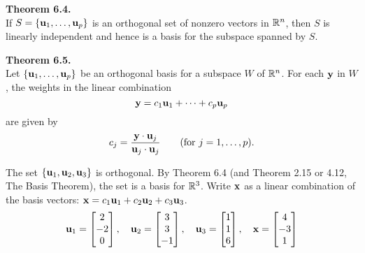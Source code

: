 \begin{boxthm}
	\textbf{Theorem 6.4.} \\
	If $S=\vectset[u]{1}{p}$ is an orthogonal set of nonzero vectors in $\R^n$, then $S$ is linearly independent and hence is a basis for the subspace spanned by $S$.
\end{boxthm}
\vspace{-1em}
\begin{boxthm}
	\textbf{Theorem 6.5.} \\
	Let $\vectset[u]{1}{p}$ be an orthogonal basis for a subspace $W$ of $\R^n$. For each $\vect{y}$ in $W$, the weights in the linear combination
	\vspace{-1ex}
	$$ \vect{y} = c_1\vect{u}_1+\cdots+c_p\vect{u}_p $$
	are given by 
	\vspace{-1ex}
	$$ c_j = \frac{\vect{y}\cdot\vect{u}_j}{\vect{u}_j\cdot\vect{u}_j} \qquad
	(\text{for } j=1,\ldots,p). $$
\end{boxthm}


\begin{exercise} %
	The set $\{\vect{u}_1,\vect{u}_2,\vect{u}_3\}$ is orthogonal. By Theorem 6.4 (and Theorem 2.15 or 4.12, The Basis Theorem), the set is a basis for $\R^3$. Write $\vect{x}$ as a linear combination of the basis vectors: $\vect{x} = c_1\vect{u}_1 + c_2\vect{u}_2 + c_3\vect{u}_3$.
	$$ \vect{u}_1 = \begin{bmatrix}2\\-2\\0\end{bmatrix}, \quad
	\vect{u}_2 = \begin{bmatrix}3\\3\\-1\end{bmatrix}, \quad
	\vect{u}_3 = \begin{bmatrix}1\\1\\6\end{bmatrix}, \quad
	\vect{x} = \begin{bmatrix}4\\-3\\1\end{bmatrix} $$
\end{exercise}
\vfill


\newpage



